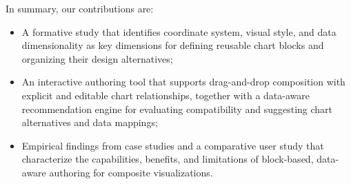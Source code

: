 In summary, our contributions are:
\begin{itemize}
    \item A formative study that identifies coordinate system, visual style,
    and data dimensionality as key dimensions for defining reusable chart
    blocks and organizing their design alternatives;

    \item An interactive authoring tool that supports
    drag-and-drop composition with explicit and editable chart relationships,
    together with a data-aware recommendation engine for evaluating
    compatibility and suggesting chart alternatives and data mappings;

    \item Empirical findings from case studies and a comparative user study
    that characterize the capabilities, benefits, and limitations of
    block-based, data-aware authoring for composite visualizations.
\end{itemize}